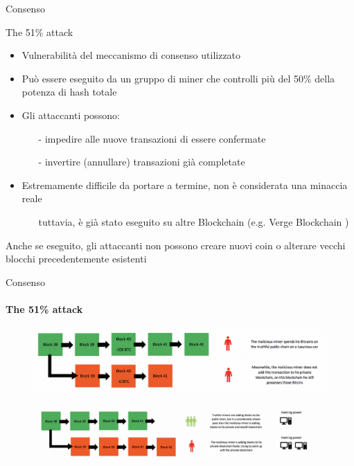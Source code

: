 \documentclass{beamer}
\begin{document}
  
  
  
  \begin{frame}{Consenso}
      \begin{block}{The 51\% attack}
        \begin{itemize}
            \item Vulnerabilità del meccanismo di consenso utilizzato
            \item Può essere eseguito da un gruppo di miner che controlli più del 50\% della potenza di hash totale
            \item Gli attaccanti possono: 
            \begin{itemize}
                \item[-] impedire alle nuove transazioni di essere confermate
                \item[-] invertire (annullare) transazioni già completate
            \end{itemize}
            \item Estremamente difficile da portare a termine, non è considerata una minaccia reale
            \begin{itemize}
                \item[\MVRightarrow] tuttavia, è già stato eseguito su altre Blockchain (e.g. Verge Blockchain \cite{bitcoinnews2018})
            \end{itemize}
        \end{itemize}
      \end{block}
      Anche se eseguito, gli attaccanti non possono creare nuovi coin o alterare vecchi blocchi precedentemente esistenti
  \end{frame}
  
  
  
  \begin{frame}{Consenso}
  \framesubtitle{The 51\% attack}
      \begin{figure}
          \centering
          \includegraphics[width=1\linewidth]{../img/attack_1.png}
      \end{figure}
      \begin{figure}
          \centering
          \includegraphics[width=1\linewidth]{../img/attack_2.png}
      \end{figure}
  \end{frame}
  
\end{document}
